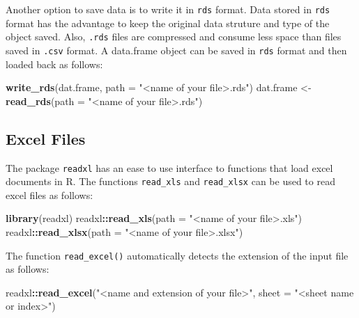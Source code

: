 \documentclass[]{book}
\newenvironment{Shaded}{\begin{snugshade}}{\end{snugshade}}
\newcommand{\KeywordTok}[1]{\textcolor[rgb]{0.13,0.29,0.53}{\textbf{#1}}}
\newcommand{\DataTypeTok}[1]{\textcolor[rgb]{0.13,0.29,0.53}{#1}}
\newcommand{\StringTok}[1]{\textcolor[rgb]{0.31,0.60,0.02}{#1}}
\newcommand{\OperatorTok}[1]{\textcolor[rgb]{0.81,0.36,0.00}{\textbf{#1}}}
\newcommand{\NormalTok}[1]{#1}
\theoremstyle{definition}
\theoremstyle{definition}
\theoremstyle{definition}
\theoremstyle{remark}
\begin{document}
Another option to save data is to write it in \texttt{rds} format. Data
stored in \texttt{rds} format has the advantage to keep the original
data struture and type of the object saved. Also, \texttt{.rds} files
are compressed and consume less space than files saved in \texttt{.csv}
format. A data.frame object can be saved in \texttt{rds} format and then
loaded back as follows:

\begin{Shaded}
\begin{Highlighting}[]
\KeywordTok{write_rds}\NormalTok{(dat.frame, }\DataTypeTok{path =} \StringTok{"<name of your file>.rds"}\NormalTok{)}
\NormalTok{dat.frame <-}\StringTok{ }\KeywordTok{read_rds}\NormalTok{(}\DataTypeTok{path =} \StringTok{"<name of your file>.rds"}\NormalTok{)}
\end{Highlighting}
\end{Shaded}

\subsection{Excel Files}\label{excel-files}

The package \texttt{readxl} has an ease to use interface to functions
that load excel documents in R. The functions \texttt{read\_xls} and
\texttt{read\_xlsx} can be used to read excel files as follows:

\begin{Shaded}
\begin{Highlighting}[]
\KeywordTok{library}\NormalTok{(readxl)}
\NormalTok{readxl}\OperatorTok{::}\KeywordTok{read_xls}\NormalTok{(}\DataTypeTok{path =} \StringTok{"<name of your file>.xls"}\NormalTok{)}
\NormalTok{readxl}\OperatorTok{::}\KeywordTok{read_xlsx}\NormalTok{(}\DataTypeTok{path =} \StringTok{"<name of your file>.xlsx"}\NormalTok{)}
\end{Highlighting}
\end{Shaded}

The function \texttt{read\_excel()} automatically detects the extension
of the input file as follows:

\begin{Shaded}
\begin{Highlighting}[]
\NormalTok{readxl}\OperatorTok{::}\KeywordTok{read_excel}\NormalTok{(}\StringTok{"<name and extension of your file>"}\NormalTok{, }\DataTypeTok{sheet =} \StringTok{"<sheet name or index>"}\NormalTok{)}
\end{Highlighting}
\end{Shaded}
\end{document}
